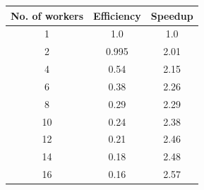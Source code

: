 \begin{center}
    \begin{tabular}{c | c | c}
        \textbf{No. of workers} & \textbf{Efficiency} & \textbf{Speedup}\\\hline\hline
         \color{OliveGreen}1 & \num{1.0} & \num{1.0}\\
         2 & \color{OliveGreen}\num{0.995} & \color{OliveGreen}\num{2.01}\\
         4 & \num{0.54} & \num{2.15}\\
         6 & \num{0.38} & \num{2.26}\\
         8 & \num{0.29} & \num{2.29}\\
         10 & \num{0.24} & \num{2.38}\\
         12 & \num{0.21} & \num{2.46}\\
         14 & \num{0.18} & \num{2.48}\\
         16 &\num{0.16} &\num{2.57}
    \end{tabular}
\end{center}